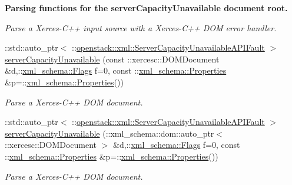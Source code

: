 \begin{Indent}{\bf Parsing functions for the serverCapacityUnavailable document root.}
\begin{DoxyCompactItemize}
\begin{DoxyCompactList}\small\item\em Parse a Xerces-\/C++ input source with a Xerces-\/C++ DOM error handler. \item\end{DoxyCompactList}\item 
::std::auto\_\-ptr$<$ ::\hyperlink{classopenstack_1_1xml_1_1ServerCapacityUnavailableAPIFault}{openstack::xml::ServerCapacityUnavailableAPIFault} $>$ \hyperlink{namespaceopenstack_1_1xml_ab7276bb32baff6394157c6fea7cc13f2}{serverCapacityUnavailable} (const ::xercesc::DOMDocument \&d,::\hyperlink{namespacexml__schema_affb4c227cbd9aa7453dd1dc5a1401943}{xml\_\-schema::Flags} f=0, const ::\hyperlink{namespacexml__schema_ad27ce19a7ee1d3b1064092648898f64c}{xml\_\-schema::Properties} \&p=::\hyperlink{namespacexml__schema_ad27ce19a7ee1d3b1064092648898f64c}{xml\_\-schema::Properties}())
\begin{DoxyCompactList}\small\item\em Parse a Xerces-\/C++ DOM document. \item\end{DoxyCompactList}\item 
::std::auto\_\-ptr$<$ ::\hyperlink{classopenstack_1_1xml_1_1ServerCapacityUnavailableAPIFault}{openstack::xml::ServerCapacityUnavailableAPIFault} $>$ \hyperlink{namespaceopenstack_1_1xml_ae02f800ddbd658e2f74f5b73d9cda08a}{serverCapacityUnavailable} (::xml\_\-schema::dom::auto\_\-ptr$<$ ::xercesc::DOMDocument $>$ \&d,::\hyperlink{namespacexml__schema_affb4c227cbd9aa7453dd1dc5a1401943}{xml\_\-schema::Flags} f=0, const ::\hyperlink{namespacexml__schema_ad27ce19a7ee1d3b1064092648898f64c}{xml\_\-schema::Properties} \&p=::\hyperlink{namespacexml__schema_ad27ce19a7ee1d3b1064092648898f64c}{xml\_\-schema::Properties}())
\begin{DoxyCompactList}\small\item\em Parse a Xerces-\/C++ DOM document. \item\end{DoxyCompactList}\end{DoxyCompactItemize}
\end{Indent}
